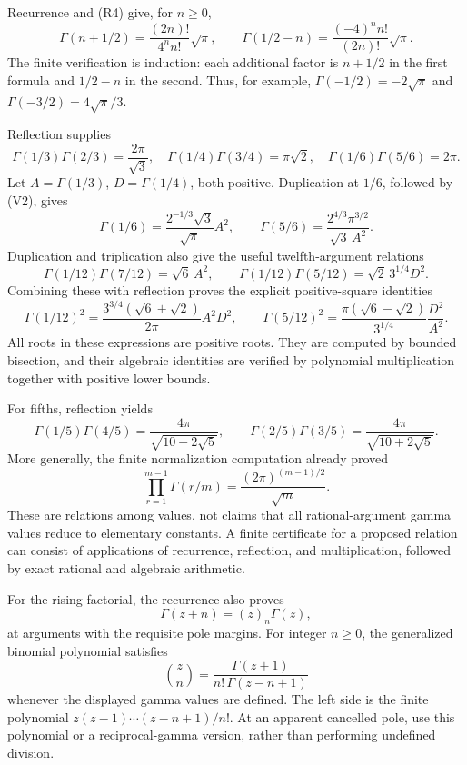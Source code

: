 Recurrence and (R4) give, for \(n\ge0\),
\[
 \Gamma(n+1/2)=\frac{(2n)!}{4^n n!}\sqrt\pi,\qquad
 \Gamma(1/2-n)=\frac{(-4)^n n!}{(2n)!}\sqrt\pi.          \tag{V1}
\]
The finite verification is induction: each additional factor is
\(n+1/2\) in the first formula and \(1/2-n\) in the second.
Thus, for example, \(\Gamma(-1/2)=-2\sqrt\pi\) and
\(\Gamma(-3/2)=4\sqrt\pi/3\).

Reflection supplies
\[
 \Gamma(1/3)\Gamma(2/3)=\frac{2\pi}{\sqrt3},\quad
 \Gamma(1/4)\Gamma(3/4)=\pi\sqrt2,\quad
 \Gamma(1/6)\Gamma(5/6)=2\pi.                           \tag{V2}
\]
Let \(A=\Gamma(1/3)\), \(D=\Gamma(1/4)\), both positive. Duplication
at \(1/6\), followed by (V2), gives
\[
 \Gamma(1/6)=\frac{2^{-1/3}\sqrt3}{\sqrt\pi}A^2,
 \qquad
 \Gamma(5/6)=\frac{2^{4/3}\pi^{3/2}}{\sqrt3\,A^2}.     \tag{V3}
\]
Duplication and triplication also give the useful twelfth-argument
relations
\[
 \Gamma(1/12)\Gamma(7/12)=\sqrt6\,A^2,
 \qquad
 \Gamma(1/12)\Gamma(5/12)=\sqrt2\,3^{1/4}D^2.           \tag{V4}
\]
Combining these with reflection proves the explicit positive-square
identities
\[
 \Gamma(1/12)^2
   =\frac{3^{3/4}(\sqrt6+\sqrt2)}{2\pi}A^2D^2,
 \qquad
 \Gamma(5/12)^2
   =\frac{\pi(\sqrt6-\sqrt2)}{3^{1/4}}\frac{D^2}{A^2}. \tag{V5}
\]
All roots in these expressions are positive roots. They are computed by
bounded bisection, and their algebraic identities are verified by
polynomial multiplication together with positive lower bounds.

For fifths, reflection yields
\[
 \Gamma(1/5)\Gamma(4/5)
       =\frac{4\pi}{\sqrt{10-2\sqrt5}},\qquad
 \Gamma(2/5)\Gamma(3/5)
       =\frac{4\pi}{\sqrt{10+2\sqrt5}}.                 \tag{V6}
\]
More generally, the finite normalization computation already proved
\[
 \prod_{r=1}^{m-1}\Gamma(r/m)
          =\frac{(2\pi)^{(m-1)/2}}{\sqrt m}.             \tag{V7}
\]
These are relations among values, not claims that all rational-argument
gamma values reduce to elementary constants. A finite certificate for a
proposed relation can consist of applications of recurrence, reflection,
and multiplication, followed by exact rational and algebraic arithmetic.

For the rising factorial, the recurrence also proves
\[
 \Gamma(z+n)=(z)_n\Gamma(z),                            \tag{V8}
\]
at arguments with the requisite pole margins. For integer \(n\ge0\),
the generalized binomial polynomial satisfies
\[
 \binom zn=\frac{\Gamma(z+1)}{n!\,\Gamma(z-n+1)}        \tag{V9}
\]
whenever the displayed gamma values are defined. The left side is the
finite polynomial \(z(z-1)\cdots(z-n+1)/n!\). At an apparent cancelled
pole, use this polynomial or a reciprocal-gamma version, rather than
performing undefined division.

